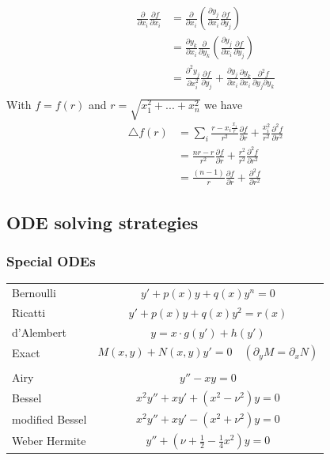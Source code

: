 \documentclass[10pt,a4paper]{article}
\theoremstyle{definition}
\begin{document}
\begin{align}
    \frac{\partial}{\partial x_i}\frac{\partial f}{\partial x_i}
    &=\frac{\partial}{\partial x_i}\left(\frac{\partial y_j}{\partial x_i}\frac{\partial f}{\partial y_j}\right)\\
    &=\frac{\partial y_k}{\partial x_i}\frac{\partial}{\partial y_k}\left(\frac{\partial y_j}{\partial x_i}\frac{\partial f}{\partial y_j}\right)\\
    &=\frac{\partial^2 y_j}{\partial x_i^2}\frac{\partial f}{\partial y_j} + \frac{\partial y_j}{\partial x_i}\frac{\partial y_k}{\partial x_i}\frac{\partial^2 f}{\partial y_j\partial y_k}\\
\end{align}
With $f=f(r)$ and $r=\sqrt{x_1^2+...+x_n^2}$ we have
\begin{align}
    \triangle f(r)
    &=\sum_i \frac{r-x_i \frac{x_i}{r}}{r^2}\frac{\partial f}{\partial r}+\frac{x_i^2}{r^2}\frac{\partial^2 f}{\partial r^2}\\
    &= \frac{nr-r}{r^2}\frac{\partial f}{\partial r}+\frac{r^2}{r^2}\frac{\partial^2 f}{\partial r^2}\\
    &= \frac{(n-1)}{r}\frac{\partial f}{\partial r}+\frac{\partial^2 f}{\partial r^2}
\end{align}

\subsection{ODE solving strategies}
\subsubsection{Special ODEs}
\begin{tabular}{lc}
Bernoulli       & $y'+p(x)y+q(x)y^n=0$\\
Ricatti         & $y'+p(x)y+q(x)y^2=r(x)$\\
d'Alembert      & $y=x\cdot g(y')+h(y')$\\
Exact           & $M(x,y)+N(x,y)y'=0 \quad (\partial_yM=\partial_xN)$\\
                & \\
Airy            & $y''-xy=0$\\
Bessel          & $x^2y''+xy'+(x^2-\nu^2)y=0$\\
modified Bessel & $x^2y''+xy'-(x^2+\nu^2)y=0$\\
Weber Hermite   & $y''+\left(\nu+\frac{1}{2}-\frac{1}{4}x^2\right)y=0$
\end{tabular}
\end{document}
